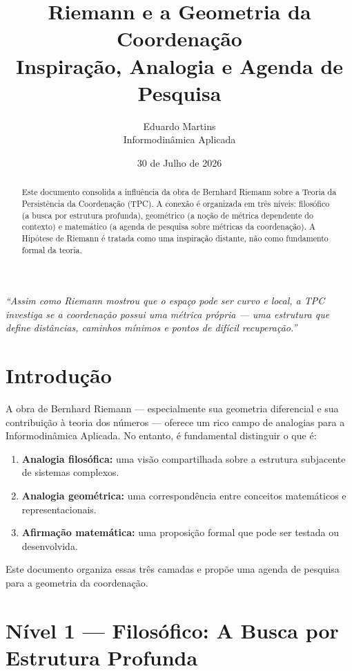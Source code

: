 \documentclass[12pt,a4paper]{article}
\title{\LARGE\textbf{Riemann e a Geometria da Coordenação}\\%
       \large Inspiração, Analogia e Agenda de Pesquisa}
\author{Eduardo Martins\\%
        \small Informodinâmica Aplicada}
\date{30 de Julho de 2026}
\begin{document}
\maketitle
\thispagestyle{empty}

\begin{center}
\textit{``Assim como Riemann mostrou que o espaço pode ser curvo e local, a TPC investiga se a coordenação possui uma métrica própria — uma estrutura que define distâncias, caminhos mínimos e pontos de difícil recuperação.''}
\end{center}

\vspace{1cm}

\begin{abstract}
Este documento consolida a influência da obra de Bernhard Riemann sobre a Teoria da Persistência da Coordenação (TPC). A conexão é organizada em três níveis: filosófico (a busca por estrutura profunda), geométrico (a noção de métrica dependente do contexto) e matemático (a agenda de pesquisa sobre métricas da coordenação). A Hipótese de Riemann é tratada como uma inspiração distante, não como fundamento formal da teoria.
\end{abstract}

\newpage
\tableofcontents
\newpage

\section{Introdução}

A obra de Bernhard Riemann — especialmente sua geometria diferencial e sua contribuição à teoria dos números — oferece um rico campo de analogias para a Informodinâmica Aplicada. No entanto, é fundamental distinguir o que é:

\begin{enumerate}
    \item \textbf{Analogia filosófica:} uma visão compartilhada sobre a estrutura subjacente de sistemas complexos.
    \item \textbf{Analogia geométrica:} uma correspondência entre conceitos matemáticos e representacionais.
    \item \textbf{Afirmação matemática:} uma proposição formal que pode ser testada ou desenvolvida.
\end{enumerate}

Este documento organiza essas três camadas e propõe uma agenda de pesquisa para a geometria da coordenação.

\section{Nível 1 — Filosófico: A Busca por Estrutura Profunda}
\end{document}
